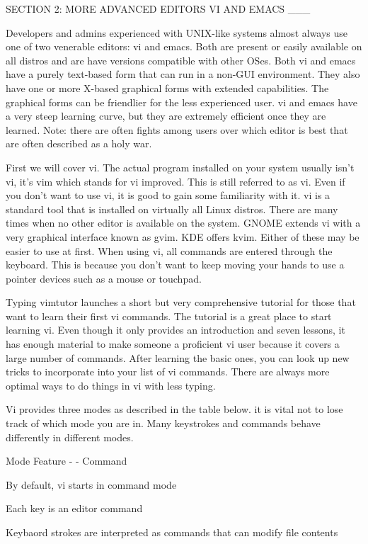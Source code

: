 SECTION 2: MORE ADVANCED EDITORS VI AND EMACS \_\_\_

Developers and admins experienced with UNIX-like systems almost always
use one of two venerable editors: vi and emacs. Both are present or
easily available on all distros and are have versions compatible with
other OSes. Both vi and emacs have a purely text-based form that can run
in a non-GUI environment. They also have one or more X-based graphical
forms with extended capabilities. The graphical forms can be friendlier
for the less experienced user. vi and emacs have a very steep learning
curve, but they are extremely efficient once they are learned. Note:
there are often fights among users over which editor is best that are
often described as a holy war.

First we will cover vi. The actual program installed on your system
usually isn't vi, it's vim which stands for vi improved. This is still
referred to as vi. Even if you don't want to use vi, it is good to gain
some familiarity with it. vi is a standard tool that is installed on
virtually all Linux distros. There are many times when no other editor
is available on the system. GNOME extends vi with a very graphical
interface known as gvim. KDE offers kvim. Either of these may be easier
to use at first. When using vi, all commands are entered through the
keyboard. This is because you don't want to keep moving your hands to
use a pointer devices such as a mouse or touchpad.

Typing vimtutor launches a short but very comprehensive tutorial for
those that want to learn their first vi commands. The tutorial is a
great place to start learning vi. Even though it only provides an
introduction and seven lessons, it has enough material to make someone a
proficient vi user because it covers a large number of commands. After
learning the basic ones, you can look up new tricks to incorporate into
your list of vi commands. There are always more optimal ways to do
things in vi with less typing.

Vi provides three modes as described in the table below. it is vital not
to lose track of which mode you are in. Many keystrokes and commands
behave differently in different modes.

Mode \textbar{} Feature - \textbar{} - Command \textbar{}

By default, vi starts in command mode

Each key is an editor command

Keybaord strokes are interpreted as commands that can modify file
contents

